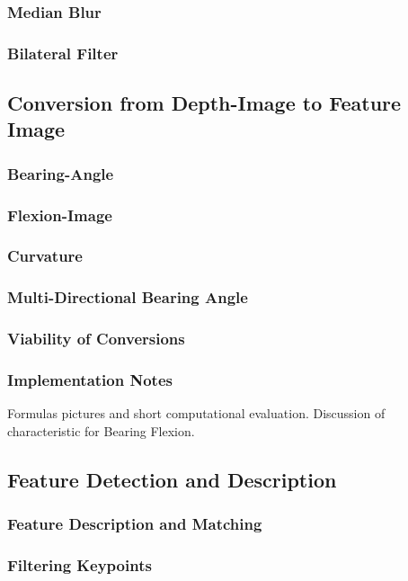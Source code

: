 \subsubsection{Median Blur}
\subsubsection{Bilateral Filter}

\subsection{Conversion from Depth-Image to Feature Image}
\subsubsection{Bearing-Angle}
\subsubsection{Flexion-Image}
\subsubsection{Curvature}
\subsubsection{Multi-Directional Bearing Angle}
\subsubsection{Viability of Conversions}
\subsubsection{Implementation Notes}

Formulas pictures and short computational evaluation.
Discussion of characteristic for Bearing Flexion.

\subsection{Feature Detection and Description}
\subsubsection{Feature Description and Matching}
\subsubsection{Filtering Keypoints}
